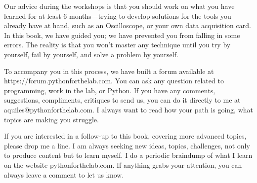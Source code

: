 Our advice during the workshops is that you should work on what you have learned for at least 6 months—trying to develop solutions for the tools you already have at hand, such as an Oscilloscope, or your own data acquisition card. In this book, we have guided you; we have prevented you from falling in some errors. The reality is that you won't master any technique until you try by yourself, fail by yourself, and solve a problem by yourself.

To accompany you in this process, we have built a forum available at https://forum.pythonforthelab.com. You can ask any question related to programming, work in the lab, or Python. If you have any comments, suggestions, compliments, critiques to send us, you can do it directly to me at aquiles@pythonforthelab.com. I always want to read how your path is going, what topics are making you struggle.

If you are interested in a follow-up to this book, covering more advanced topics, please drop me a line. I am always seeking new ideas, topics, challenges, not only to produce content but to learn myself. I do a periodic braindump of what I learn on the website pythonforthelab.com. If anything grabs your attention, you can always leave a comment to let us know.
